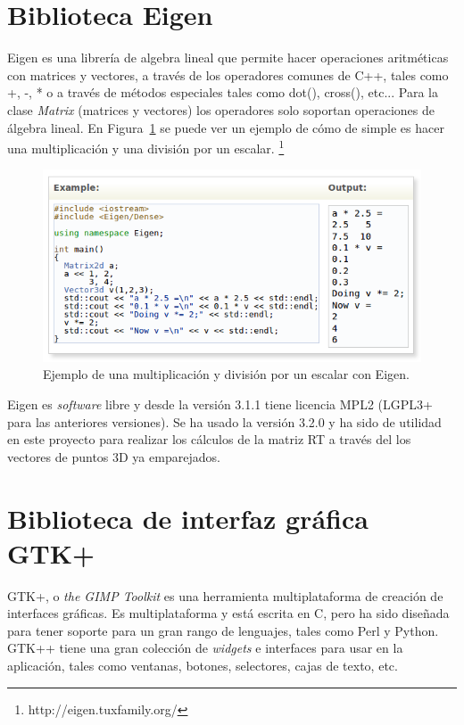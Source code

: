 \section{Biblioteca Eigen}
Eigen es una librería de algebra lineal que permite hacer operaciones aritméticas con matrices y vectores, a través de los operadores comunes de C++, tales como +, -, * o a través de métodos especiales tales como dot(), cross(), etc... Para la clase \textit{Matrix} (matrices y vectores) los operadores solo soportan operaciones de álgebra lineal. En Figura~\ref{fig:Eigen} se puede ver un ejemplo de cómo de simple es hacer una multiplicación y una división por un escalar. \footnote{http://eigen.tuxfamily.org/}

\begin{figure}[th]
\centering
\includegraphics[scale=0.65]{Figures/eigen-multiplication.png}
\decoRule
\caption[Ejemplo con Eigen]{Ejemplo de una multiplicación y división por un escalar con Eigen.}
\label{fig:Eigen}
\end{figure}

Eigen es \textit{software} libre y desde la versión 3.1.1 tiene licencia MPL2 (LGPL3+ para las anteriores versiones). Se ha usado la versión 3.2.0 y ha sido de utilidad en este proyecto para realizar los cálculos de la matriz RT a través del los vectores de puntos 3D ya emparejados.

\section{Biblioteca de interfaz gráfica GTK+}
GTK+, o \textit{the GIMP Toolkit} es una herramienta multiplataforma de creación de interfaces gráficas. Es multiplataforma y está escrita en C, pero ha sido diseñada para tener soporte para un gran rango de lenguajes, tales como Perl y Python. GTK++ tiene una gran colección de \textit{widgets} e interfaces para usar en la aplicación, tales como ventanas, botones, selectores, cajas de texto, etc.

